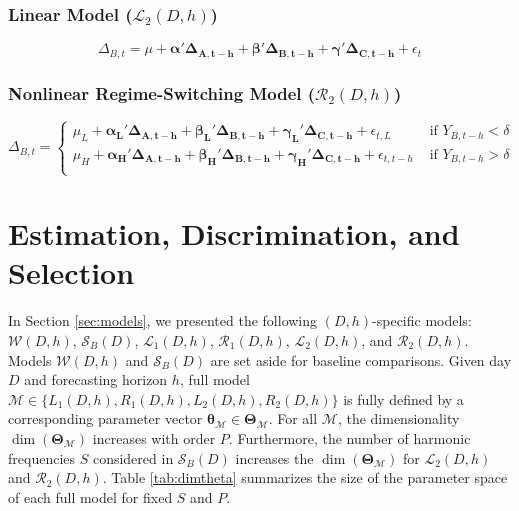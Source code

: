 \subsubsection{Linear Model ($\mathcal{L}_2(D,h)$)}
\begin{equation}
\label{eq:ardl2}
\Delta_{B,t}=\mu+\bm{\alpha}'\bm{\Delta_{A,t-h}}+\bm{\beta}'\bm{\Delta_{B,t-h}}+\bm{\gamma}'\bm{\Delta_{C,t-h}}+\epsilon_t
\end{equation}

\subsubsection{Nonlinear Regime-Switching Model ($\mathcal{R}_2(D,h)$)}
\begin{equation}
\label{eq:setardl2}
\Delta_{B,t}=
  \begin{cases}
    \mu_L+\bm{\alpha_L}'\bm{\Delta_{A,t-h}}+\bm{\beta_L}'\bm{\Delta_{B,t-h}}+\bm{\gamma_L}'\bm{\Delta_{C,t-h}}+\epsilon_{t,L} & \textrm{ if } Y_{B,t-h}<\delta \\
    \mu_H+\bm{\alpha_H}'\bm{\Delta_{A,t-h}}+\bm{\beta_H}'\bm{\Delta_{B,t-h}}+\bm{\gamma_H}'\bm{\Delta_{C,t-h}}+\epsilon_{t,t-h} & \textrm{ if } Y_{B,t-h}>\delta \\
  \end{cases}
\end{equation}








\section{Estimation, Discrimination, and Selection}
\label{sec:bayesest}
In Section \ref{sec:models}, we presented the following $(D,h)$-specific models: $\mathcal{W}(D,h)$, $\mathcal{S}_B(D)$, $\mathcal{L}_1(D,h)$, $\mathcal{R}_1(D,h)$, $\mathcal{L}_2(D,h)$, and $\mathcal{R}_2(D,h)$. Models $\mathcal{W}(D,h)$ and $\mathcal{S}_B(D)$ are set aside for baseline comparisons. Given day $D$ and forecasting horizon $h$, full model $\mathcal{M} \in \{L_1(D,h),R_1(D,h),L_2(D,h),R_2(D,h)\}$ is fully defined by a corresponding parameter vector $\bm{\theta}_{\mathcal{M}}\in \bm{\Theta}_\mathcal{M}$. For all $\mathcal{M}$, the dimensionality $\dim(\bm{\Theta}_\mathcal{M})$ increases with order $P$. Furthermore, the number of harmonic frequencies $S$ considered in $\mathcal{S}_B(D)$ increases the $\dim(\bm{\Theta}_\mathcal{M})$ for $\mathcal{L}_2(D,h)$ and $\mathcal{R}_2(D,h)$. Table \ref{tab:dimtheta} summarizes the size of the parameter space of each full model for fixed $S$ and $P$.


